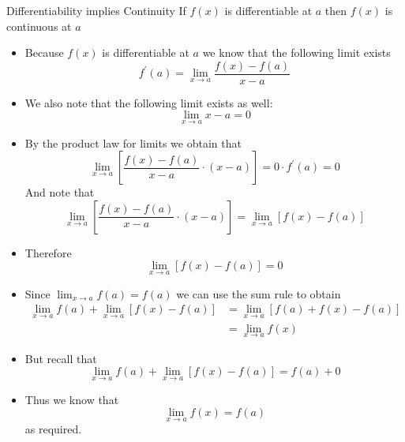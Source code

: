 \documentclass{standalone}
\begin{document}
\begin{theo*}{Differentiability implies Continuity}
  If $f\left(x\right)$ is differentiable at $a$ then $f\left(x\right)$ is continuous at $a$ 
  \begin{pf}
    \begin{itemize}
     \item Because $f\left(x\right)$ is differentiable at $a$  we know that the following limit exists 
       \[
       f ^{ \prime }\left(a\right) = \lim_{x \to a } \frac{ f\left(x\right)  -  f\left(a\right)}{ x  -  a}
       \]
      \item We also note that the following limit exists as well:
        \[
        \lim_{x\to a} x  -  a = 0
        \]
      \item By the product law for limits we obtain that 
        \[
        \lim_{x \to a} \left[ \frac{f\left(x\right)  -  f\left(a\right)}{x  -  a}  \cdot  \left( x  -  a \right)  \right] = 0  \cdot  f ^{\prime}\left(a\right) = 0
        \]
        And note that  
        \[
          \lim_{x \to a} \left[ \frac{f\left(x\right)  -  f\left(a\right)}{x  -  a}  \cdot  \left( x  -  a \right)  \right] = \lim_{x \to a} \left[f\left(x\right)  -  f\left(a\right)  \right]
        \]
        \item Therefore
          \[
          \lim_{x \to a} \left[f\left(x\right)  -  f\left(a\right)  \right] = 0
          \]
        \item Since $\lim_{x \to a} f\left(a\right) = f\left(a\right)$ we can use the sum rule to obtain 
          \begin{align*}
            \lim_{x \to a} f\left(a\right)  +  \lim_{x \to a} \left[ f\left(x\right)  -  f\left(a\right) \right] &= \lim_{x \to a} \left[ f\left(a\right)  +  f\left(x\right)  -  f\left(a\right) \right] \\
                                                                                                                 &= \lim_{x \to a} f\left(x\right) 
          \end{align*}
        \item But recall that 
          \[
            \lim_{x \to a} f\left(a\right)  +  \lim_{x \to a} \left[ f\left(x\right)  -  f\left(a\right) \right]  = f\left(a\right)  +  0
          \]
        \item Thus we know that 
          \[
          \lim_{x \to a} f\left(x\right) = f\left(a\right)
          \]
          as required.
    \end{itemize}
  \end{pf}
\end{theo*}
\end{document}
